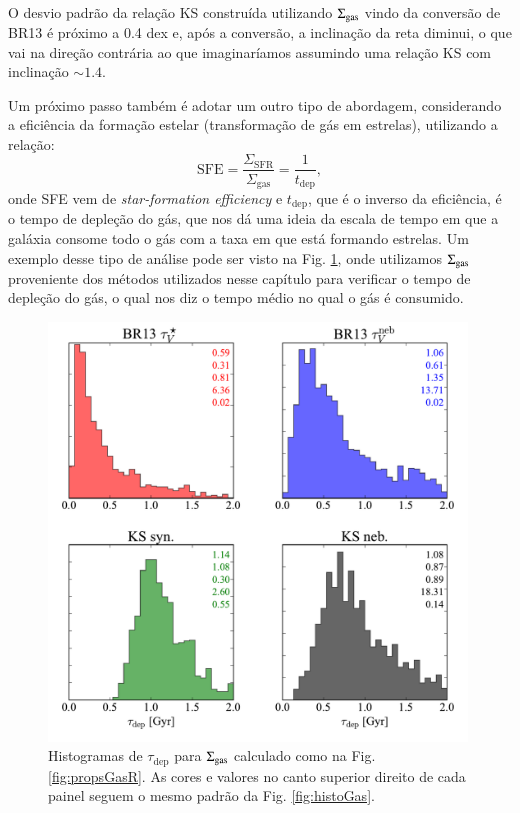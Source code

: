 O desvio padrão da relação KS construída utilizando $\Sigma_{\mathrm{gas}}$ vindo da conversão de
BR13 é próximo a 0.4 dex e, após a conversão, a inclinação da reta diminui, o que vai na direção
contrária ao que imaginaríamos assumindo uma relação KS com inclinação $\sim 1.4$. 

Um próximo passo também é adotar um outro tipo de abordagem, considerando a eficiência da
formação estelar (transformação de gás em estrelas), utilizando a relação:
\begin{equation}
	\mathrm{SFE} = \frac{\Sigma_{\mathrm{SFR}}}{\Sigma_{\mathrm{gas}}} = \frac{1}{t_{\mathrm{dep}}},
	\label{eq:SFE}
\end{equation}
\noindent onde SFE vem de {\em star-formation efficiency} e $t_{\mathrm{dep}}$, que é o inverso da
eficiência, é o tempo de depleção do gás, que nos dá uma ideia da escala de tempo em que a galáxia
consome todo o gás com a taxa em que está formando estrelas. Um exemplo desse tipo de análise pode
ser visto na Fig. \ref{fig:tdep}, onde utilizamos $\Sigma_{\mathrm{gas}}$ proveniente dos métodos utilizados
nesse capítulo para verificar o tempo de depleção do gás, o qual nos diz o tempo médio no qual o
gás é consumido.

\begin{figure}
	\centering
	\includegraphics[width=0.99\textwidth]{figuras/histo_tdep.pdf}
	\caption[Tempo de depleção do gás.]
	{Histogramas de $\tau_{\mathrm{dep}}$ para $\Sigma_{\mathrm{gas}}$ calculado como na Fig. \ref{fig:propsGasR}.
As cores e valores no canto superior direito de cada painel seguem o mesmo padrão da Fig. \ref{fig:histoGas}.}
	\label{fig:tdep}
\end{figure}

